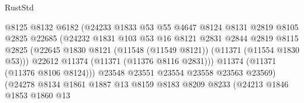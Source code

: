 \begin{lexlean}{RustStd}
\begin{coremodule}
                                      @8125
                                      @8132
                                      @6182
                                      (@24233
                                        @1833
                                        @53
                                        @55
                                        @4647
                                        @8124
                                        @8131
                                        @2819
                                        @8105
                                        @2825
                                        @22685
                                        (@24232
                                          @1831
                                          @103
                                          @53
                                          @16
                                          @8121
                                          @2831
                                          @2844
                                          @2819
                                          @8115
                                          @2825
                                          (@22645
                                            @1830
                                            @8121
                                            (@11548 (@11549 @8121))
                                            (@11371 (@11554 @1830 @53)))
                                          @22612
                                          @11374
                                          (@11371 (@11376 @8116 @2831)))
                                        @11374
                                        (@11371 (@11376 @8106 @8124)))
                                      @23548
                                      @23551
                                      @23554
                                      @23558
                                      @23563
                                      @23569)
                                    (@24278
                                      @8134
                                      @1861
                                      @1887
                                      @13
                                      @8159
                                      @8183
                                      @8209
                                      @8233
                                      (@24213
                                        @1846
                                        @1853
                                        @1860
                                        @13

\end{coremodule}
\end{lexlean}
